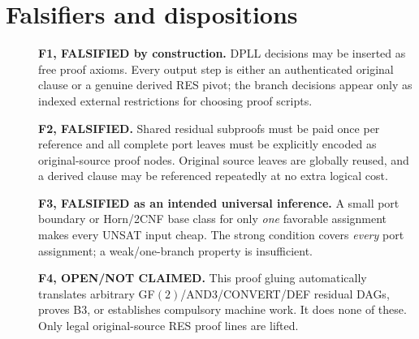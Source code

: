 \documentclass[11pt]{article}
\begin{document}
\section*{Falsifiers and dispositions}
\begin{description}
\item[]\textbf{F1, FALSIFIED by construction.} DPLL decisions may be inserted as free proof axioms. Every output step is either an authenticated original clause or a genuine derived RES pivot; the branch decisions appear only as indexed external restrictions for choosing proof scripts.
\item[]\textbf{F2, FALSIFIED.} Shared residual subproofs must be paid once per reference and all complete port leaves must be explicitly encoded as original-source proof nodes. Original source leaves are globally reused, and a derived clause may be referenced repeatedly at no extra logical cost.
\item[]\textbf{F3, FALSIFIED as an intended universal inference.} A small port boundary or Horn/2CNF base class for only \emph{one} favorable assignment makes every UNSAT input cheap. The strong condition covers \emph{every} port assignment; a weak/one-branch property is insufficient.
\item[]\textbf{F4, OPEN/NOT CLAIMED.} This proof gluing automatically translates arbitrary GF$(2)$/AND3/CONVERT/DEF residual DAGs, proves B3, or establishes compulsory machine work. It does none of these. Only legal original-source RES proof lines are lifted.
\end{description}
\end{document}
